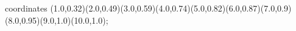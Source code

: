 					coordinates { (1.0,0.32)(2.0,0.49)(3.0,0.59)(4.0,0.74)(5.0,0.82)(6.0,0.87)(7.0,0.9)(8.0,0.95)(9.0,1.0)(10.0,1.0)};